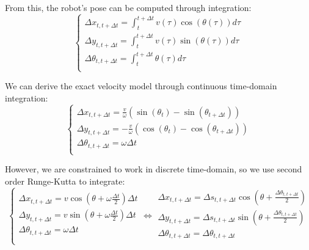 \documentclass[a4paper, 10pt]{article}
\begin{document}
From this, the robot's pose can be computed through integration:
\begin{equation}
\left\{
\begin{array}{lcl}
    \Delta x_{t,t+\Delta t} = \int_t^{t+\Delta t} v(\tau) \cos(\theta(\tau)) d\tau \\
    \Delta y_{t,t+\Delta t} = \int_t^{t+\Delta t} v(\tau) \sin(\theta(\tau)) d\tau \\
    \Delta \theta_{t,t+\Delta t} = \int_t^{t+\Delta t} \theta(\tau) d\tau \\
\end{array}
\right.
\end{equation}

We can derive the exact velocity model through continuous time-domain integration:
\begin{equation}
\left\{
\begin{array}{lcl}
    \Delta x_{t,t+\Delta t} = \frac{v}{\omega} (\sin(\theta_{t}) - \sin(\theta_{t+\Delta t})) \\
    \Delta y_{t,t+\Delta t} = - \frac{v}{\omega} (\cos(\theta_{t}) - \cos(\theta_{t+\Delta t})) \\
    \Delta \theta_{t,t+\Delta t} = \omega \Delta t \\
\end{array}
\right.
\end{equation}

However, we are constrained to work in discrete time-domain, so we use second order Runge-Kutta to integrate:
\begin{equation}
\left\{
\begin{array}{lcl}
    \Delta x_{t,t+\Delta t} = v \cos(\theta + \omega \frac{\Delta t}{2}) \Delta t \\
    \Delta y_{t,t+\Delta t} = v \sin(\theta + \omega \frac{\Delta t}{2}) \Delta t \\
    \Delta \theta_{t,t+\Delta t} = \omega \Delta t \\
\end{array}
\iff
\begin{array}{lcl}
    \Delta x_{t,t+\Delta t} = \Delta s_{t,t+\Delta t} \cos(\theta + \frac{\Delta \theta_{t,t+\Delta t}}{2}) \\
    \Delta y_{t,t+\Delta t} = \Delta s_{t,t+\Delta t} \sin(\theta + \frac{\Delta \theta_{t,t+\Delta t}}{2}) \\
    \Delta \theta_{t,t+\Delta t} = \Delta \theta_{t,t+\Delta t} \\
\end{array}
\right.
\end{equation}
\end{document}
